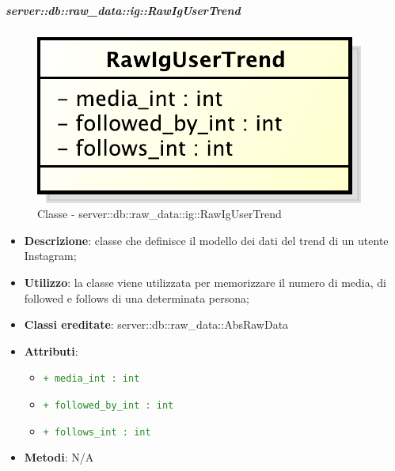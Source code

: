 		\subparagraph{server::db::raw\_data::ig::RawIgUserTrend} %
		\label{subp:server_db_raw_data_ig_rawigusertrend}
			\begin{figure}[htbp]
				\centering
				\centerline{\includegraphics[scale=0.75]{./images/server/classes/db/raw_ig_user_trend.pdf}}
				\caption{Classe - server::db::raw\_data::ig::RawIgUserTrend}
			\end{figure}
			\begin{itemize}
				\item \textbf{Descrizione}: classe che definisce il modello dei dati del trend di un utente Instagram;
				\item \textbf{Utilizzo}: la classe viene utilizzata per memorizzare il numero di media, di followed e follows di una determinata persona;
				\item \textbf{Classi ereditate}: server::db::raw\_data::AbsRawData
				\item \textbf{Attributi}:
					\begin{itemize}
						\item \textcolor{forestgreen}{\texttt{+ media\_int : int}}
						\item \textcolor{forestgreen}{\texttt{+ followed\_by\_int : int}}
						\item \textcolor{forestgreen}{\texttt{+ follows\_int : int}}
					\end{itemize}
				\item \textbf{Metodi}: N/A
			\end{itemize}



